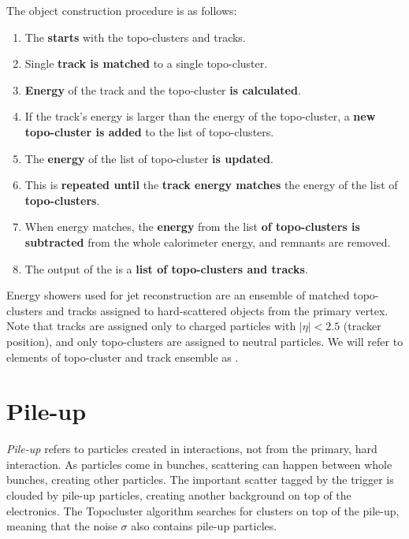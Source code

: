 The object construction procedure is as follows:
\begin{enumerate}
    \item The \PFa \textbf{starts} with the topo-clusters and tracks.
    \item Single \textbf{track is matched} to a single topo-cluster.
    \item \textbf{Energy} of the track and the topo-cluster \textbf{is calculated}.
    \item If the track's energy is larger than the energy of the topo-cluster, a \textbf{new topo-cluster is added} to the list of topo-clusters.
    \item The \textbf{energy} of the list of topo-cluster \textbf{is updated}.
    \item This is \textbf{repeated until} the \textbf{track energy matches} the energy of the list of \textbf{topo-clusters}.
    \item When energy matches, the \textbf{energy} from the list \textbf{of topo-clusters is subtracted} from the whole calorimeter energy, and remnants are removed.
    \item The output of the \PFa is a \textbf{list of topo-clusters and tracks}.
\end{enumerate}

Energy showers used for jet reconstruction are an ensemble of matched topo-clusters and tracks assigned to hard-scattered objects from the primary vertex. 
Note that tracks are assigned only to charged particles with $|\eta| < 2.5$ (tracker position), and only topo-clusters are assigned to neutral particles.
We will refer to elements of topo-cluster and track ensemble as \PFOs. 

\section{Pile-up}
\label{sec:pileup}
\emph{Pile-up} refers to particles created in interactions, not from the primary, hard interaction.
As particles come in bunches, scattering can happen between whole bunches, creating other particles.
The important scatter tagged by the trigger is clouded by pile-up particles, creating another background on top of the electronics.
The Topocluster algorithm searches for clusters on top of the pile-up, meaning that the noise $\sigma$ also contains pile-up particles.


